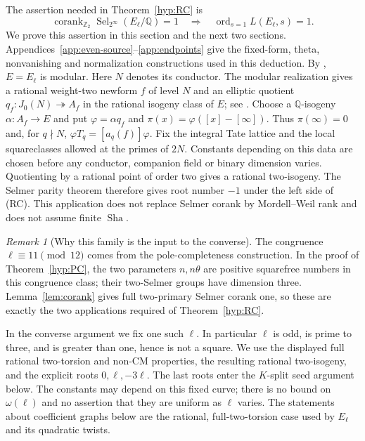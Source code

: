 \documentclass[11pt]{article}
\theoremstyle{definition}
\theoremstyle{remark}
\newtheorem{remark}[theorem]{Remark}
\newcommand{\Q}{\mathbb Q}
\newcommand{\Z}{\mathbb Z}
\newcommand{\Sel}{\operatorname{Sel}}
\newcommand{\Sha}{\operatorname{Sha}}
\newcommand{\ord}{\operatorname{ord}}
\begin{document}
The assertion needed in Theorem~\ref{hyp:RC} is
\[
 \operatorname{corank}_{\Z_2}\Sel_{2^\infty}(E_\ell/\Q)=1
 \quad\Longrightarrow\quad \ord_{s=1}L(E_\ell,s)=1.                 \tag{RC}
\]
We prove this assertion in this section and the next two sections.
Appendices~\ref{app:even-source}--\ref{app:endpoints} give the fixed-form,
theta, nonvanishing and normalization constructions used in this deduction.
By \cite[Theorem A and Introduction, conditions (1)--(6)]{bcdt},
$E=E_\ell$ is modular. Here $N$ denotes its conductor.
The modular realization gives a rational weight-two newform $f$
of level $N$ and an elliptic quotient $q_f:J_0(N)\twoheadrightarrow A_f$
in the rational isogeny class of $E$; see
\cite[Theorem 11.19 and Remark 11.18]{milnemf}.
Choose a $\Q$-isogeny $\alpha:A_f\to E$ and put
$\varphi=\alpha q_f$ and $\pi(x)=\varphi([x]-[\infty])$.
Thus $\pi(\infty)=0$ and, for $q\nmid N$,
$\varphi T_q=[a_q(f)]\varphi$.
Fix the integral Tate lattice
and the local squareclasses allowed at the primes of $2N$.
Constants depending on this data are chosen before any conductor,
companion field or binary dimension varies. Quotienting by a rational
point of order two gives a rational two-isogeny. The Selmer parity
theorem \cite[Theorem 1.8]{dd} therefore gives root number $-1$
under the left side of (RC). This application does not replace Selmer
corank by Mordell--Weil rank and does not assume finite $\Sha$.
\begin{remark}[Why this family is the input to the converse]\label{ex:sec7-rc-scope}
The congruence $\ell\equiv11\pmod {12}$ comes from the pole-completeness
construction. In the proof of Theorem~\ref{hyp:PC}, the two parameters
$n,n\theta$ are positive squarefree numbers in this congruence class;
their two-Selmer groups have dimension three. Lemma~\ref{lem:corank}
gives full two-primary Selmer corank one, so these are exactly the
two applications required of Theorem~\ref{hyp:RC}.

In the converse argument we fix one such $\ell$. In particular $\ell$
is odd, is prime to three, and is greater than one, hence is not a
square. We use the displayed full rational two-torsion and non-CM
properties, the resulting rational two-isogeny, and the explicit roots
$0,\ell,-3\ell$. The last roots enter the $K$-split seed argument below.
The constants may depend on this fixed curve; there is no bound on
$\omega(\ell)$ and no assertion that they are uniform as $\ell$ varies.
The statements about coefficient graphs below are the rational,
full-two-torsion case used by $E_\ell$ and its quadratic twists.
\end{remark}
\end{document}
